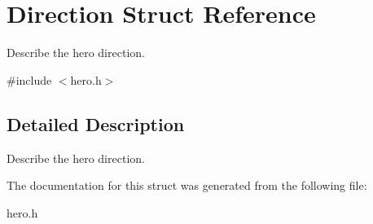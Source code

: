\hypertarget{structDirection}{}\section{Direction Struct Reference}
\label{structDirection}


Describe the hero direction.  




{\ttfamily \#include $<$hero.\+h$>$}



\subsection{Detailed Description}
Describe the hero direction. 

The documentation for this struct was generated from the following file\+:\begin{DoxyCompactItemize}
\item 
hero.\+h\end{DoxyCompactItemize}
